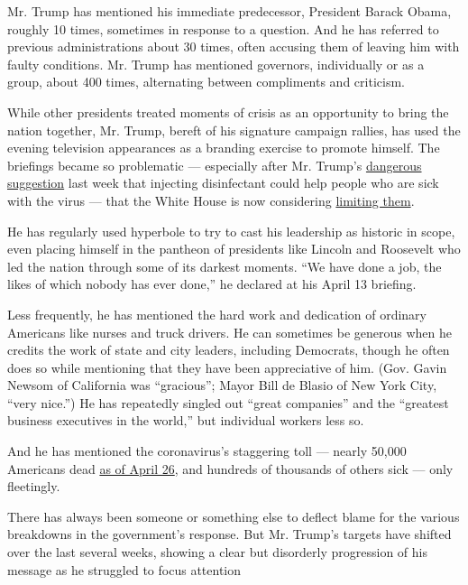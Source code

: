 Mr. Trump has mentioned his immediate predecessor, President Barack
Obama, roughly 10 times, sometimes in response to a question. And he has
referred to previous administrations about 30 times, often accusing them
of leaving him with faulty conditions. Mr. Trump has mentioned
governors, individually or as a group, about 400 times, alternating
between compliments and criticism.

While other presidents treated moments of crisis as an opportunity to
bring the nation together, Mr. Trump, bereft of his signature campaign
rallies, has used the evening television appearances as a branding
exercise to promote himself. The briefings became so problematic ---
especially after Mr. Trump's
\href{https://www.nytimes3xbfgragh.onion/2020/04/24/us/politics/trump-inject-disinfectant-bleach-coronavirus.html}{dangerous
suggestion} last week that injecting disinfectant could help people who
are sick with the virus --- that the White House is now considering
\href{https://www.nytimes3xbfgragh.onion/2020/04/26/us/politics/trump-disinfectant.html}{limiting
them}.

He has regularly used hyperbole to try to cast his leadership as
historic in scope, even placing himself in the pantheon of presidents
like Lincoln and Roosevelt who led the nation through some of its
darkest moments. ``We have done a job, the likes of which nobody has
ever done,'' he declared at his April 13 briefing.

Less frequently, he has mentioned the hard work and dedication of
ordinary Americans like nurses and truck drivers. He can sometimes be
generous when he credits the work of state and city leaders, including
Democrats, though he often does so while mentioning that they have been
appreciative of him. (Gov. Gavin Newsom of California was ``gracious'';
Mayor Bill de Blasio of New York City, ``very nice.'') He has repeatedly
singled out ``great companies'' and the ``greatest business executives
in the world,'' but individual workers less so.

And he has mentioned the coronavirus's staggering toll --- nearly 50,000
Americans dead
\href{https://www.nytimes3xbfgragh.onion/interactive/2020/us/coronavirus-us-cases.html}{as
of April 26}, and hundreds of thousands of others sick --- only
fleetingly.

There has always been someone or something else to deflect blame for the
various breakdowns in the government's response. But Mr. Trump's targets
have shifted over the last several weeks, showing a clear but disorderly
progression of his message as he struggled to focus attention

